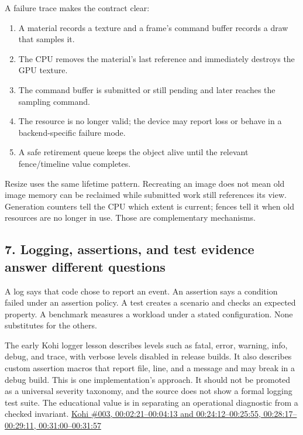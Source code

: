 A failure trace makes the contract clear:

\begin{enumerate}
\def\labelenumi{\arabic{enumi}.}
\tightlist
\item
  A material records a texture and a frame's command buffer records a draw that samples it.
\item
  The CPU removes the material's last reference and immediately destroys the GPU texture.
\item
  The command buffer is submitted or still pending and later reaches the sampling command.
\item
  The resource is no longer valid; the device may report loss or behave in a backend-specific failure mode.
\item
  A safe retirement queue keeps the object alive until the relevant fence/timeline value completes.
\end{enumerate}

Resize uses the same lifetime pattern. Recreating an image does not mean old image memory can be reclaimed while submitted work still references its view. Generation counters tell the CPU which extent is current; fences tell it when old resources are no longer in use. Those are complementary mechanisms.

\subsection{7. Logging, assertions, and test evidence answer different questions}\label{06-engine-ii-ch041-logging-assertions-and-test-evidence-answer-different-questions}

A log says that code chose to report an event. An assertion says a condition failed under an assertion policy. A test creates a scenario and checks an expected property. A benchmark measures a workload under a stated configuration. None substitutes for the others.

The early Kohi logger lesson describes levels such as fatal, error, warning, info, debug, and trace, with verbose levels disabled in release builds. It also describes custom assertion macros that report file, line, and a message and may break in a debug build. This is one implementation's approach. It should not be promoted as a universal severity taxonomy, and the source does not show a formal logging test suite. The educational value is in separating an operational diagnostic from a checked invariant. \href{https://www.youtube.com/watch?v=l9e8PJskYnI&t=2m21s}{Kohi \#003, 00:02:21--00:04:13 and 00:24:12--00:25:55, 00:28:17--00:29:11, 00:31:00--00:31:57}

